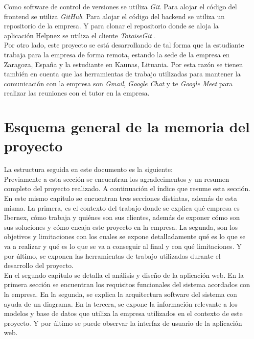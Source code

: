 Como software de control de versiones se utiliza \textit{Git}. Para alojar el código del frontend se utiliza \textit{GitHub}. Para alojar el código del backend se utiliza un repositorio de la empresa. Y para clonar el repositorio donde se aloja la aplicación Helpnex se utiliza el cliente \textit{TotoiseGit} \cite{tortoise-git}.\\

Por otro lado, este proyecto se está desarrollando de tal forma que la estudiante trabaja para la empresa de forma remota, estando la sede de la empresa en Zaragoza, España y la estudiante en Kaunas, Lituania. Por esta razón se tienen también en cuenta que las herramientas de trabajo utilizadas para mantener la comunicación con la empresa son \textit{Gmail}, \textit{Google Chat} y te \textit{Google Meet} para realizar las reuniones con el tutor en la empresa.

\section{Esquema general de la memoria del proyecto}


La estructura seguida en este documento es la siguiente:\\

Previamente a esta sección se encuentran los agradecimentos y un resumen completo del proyecto realizado. A continuación el índice que resume esta sección.\\

En este mismo capítulo se encuentran tres secciones distintas, además de esta misma. La primera, es el contexto del trabajo donde se explica qué empresa es Ibernex, cómo trabaja y quiénes son sus clientes, además de exponer cómo son sus soluciones y cómo encaja este proyecto en la empresa. La segunda, son los objetivos y limitaciones con los cuales se expone detalladamente qué es lo que se va a realizar y qué es lo que se va a conseguir al final y con qué limitaciones. Y por último, se exponen las herramientas de trabajo utilizadas durante el desarrollo del proyecto.\\

En el segundo capítulo se detalla el análisis y diseño de la aplicación web. En la primera sección se encuentran los requisitos funcionales del sistema acordados con la empresa. En la segunda, se explica la arquitectura software del sistema con ayuda de un diagrama. En la tercera, se expone la información relevante a los modelos y base de datos que utiliza la empresa utilizados en el contexto de este proyecto. Y por último se puede observar la interfaz de usuario de la aplicación web. \\

